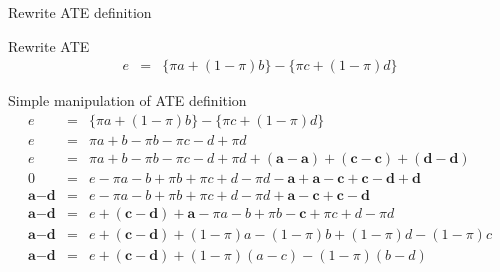 \documentclass{beamer}
\begin{document}
\begin{frame}{Rewrite ATE definition}


  \begin{block}{Rewrite ATE}
    \begin{eqnarray*}
      e&=&\{\pi{a} + (1-\pi)b\} - \{\pi{c} + (1-\pi)d\}
    \end{eqnarray*}
  \end{block}

\end{frame}




\begin{frame}[plain]

  \begin{block}{Simple manipulation of ATE definition}
    \begin{eqnarray*}
      e&=&\{\pi{a} + (1-\pi)b\} - \{\pi{c} + (1-\pi)d\}  \\
      e&=&\pi{a} + b - \pi{b} - \pi{c} - d + \pi{d}  \\
      e&=&\pi{a} + b - \pi{b} - \pi{c} - d + \pi{d} + (\textbf{a} - \textbf{a}) + (\textbf{c} - \textbf{c}) + (\textbf{d} - \textbf{d})  \\
      0&=&e-\pi{a} - b + \pi{b} + \pi{c} + d - \pi{d} - \textbf{a} + \textbf{a} - \textbf{c} + \textbf{c} - \textbf{d} + \textbf{d}  \\
      \textbf{a}-\textbf{d}&=&e-\pi{a} - b + \pi{b} + \pi{c} + d - \pi{d}  + \textbf{a} - \textbf{c} + \textbf{c} - \textbf{d}  \\
      \textbf{a}-\textbf{d}&=&e  + (\textbf{c} - \textbf{d}) + \textbf{a}-\pi{a} - b + \pi{b} - \textbf{c} + \pi{c} + d - \pi{d} \\
      \textbf{a}-\textbf{d}&=&e  + (\textbf{c} - \textbf{d}) + (1-\pi)a -(1-\pi)b + (1-\pi)d - (1-\pi)c  \\
      \textbf{a}-\textbf{d}&=&e  + (\textbf{c} - \textbf{d}) + (1-\pi)(a-c) -(1-\pi)(b-d)
    \end{eqnarray*}
  \end{block}


\end{frame}
\end{document}
